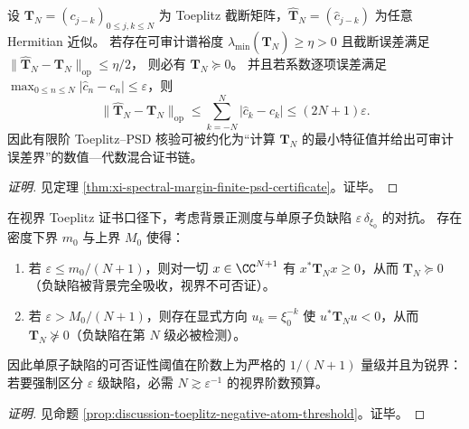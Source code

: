 \begin{conclusion}\label{con:xi-terminal-toeplitz-psd-numerical-robustness}
设 \(\mathbf{T}_N=(c_{j-k})_{0\le j,k\le N}\) 为 Toeplitz 截断矩阵，\(\widehat{\mathbf{T}}_N=(\widehat c_{j-k})\) 为任意 Hermitian 近似。
若存在可审计谱裕度 \(\lambda_{\min}(\widehat{\mathbf{T}}_N)\ge\eta>0\) 且截断误差满足
\(
\|\widehat{\mathbf{T}}_N-\mathbf{T}_N\|_{\mathrm{op}}\le \eta/2
\)，
则必有 \(\mathbf{T}_N\succeq 0\)。
并且若系数逐项误差满足 \(\max_{0\le n\le N}|\widehat c_n-c_n|\le\varepsilon\)，则
\[
\|\widehat{\mathbf{T}}_N-\mathbf{T}_N\|_{\mathrm{op}}
\le\sum_{k=-N}^{N}|\widehat c_k-c_k|
\le (2N+1)\varepsilon.
\]
因此有限阶 Toeplitz--PSD 核验可被约化为“计算 \(\widehat{\mathbf{T}}_N\) 的最小特征值并给出可审计误差界”的数值—代数混合证书链。
\end{conclusion}
\begin{proof}[证明]
见定理 \ref{thm:xi-spectral-margin-finite-psd-certificate}。证毕。
\end{proof}

\begin{conclusion}\label{con:xi-terminal-toeplitz-negative-atom-threshold-sharp}
在视界 Toeplitz 证书口径下，考虑背景正测度与单原子负缺陷 \(\varepsilon\,\delta_{\xi_0}\) 的对抗。
存在密度下界 \(m_0\) 与上界 \(M_0\) 使得：
\begin{enumerate}
  \item 若 \(\varepsilon\le m_0/(N+1)\)，则对一切 \(x\in\CC^{N+1}\) 有 \(x^\ast \mathbf{T}_N x\ge 0\)，从而 \(\mathbf{T}_N\succeq 0\)（负缺陷被背景完全吸收，视界不可否证）。
  \item 若 \(\varepsilon> M_0/(N+1)\)，则存在显式方向 \(u_k=\xi_0^{-k}\) 使 \(u^\ast\mathbf{T}_N u<0\)，从而 \(\mathbf{T}_N\not\succeq 0\)（负缺陷在第 \(N\) 级必被检测）。
\end{enumerate}
因此单原子缺陷的可否证性阈值在阶数上为严格的 \(1/(N+1)\) 量级并且为锐界：若要强制区分 \(\varepsilon\) 级缺陷，必需 \(N\gtrsim \varepsilon^{-1}\) 的视界阶数预算。
\end{conclusion}
\begin{proof}[证明]
见命题 \ref{prop:discussion-toeplitz-negative-atom-threshold}。证毕。
\end{proof}
